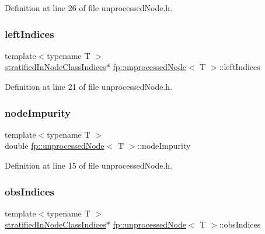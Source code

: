 Definition at line 26 of file unprocessed\+Node.\+h.

\mbox{\label{classfp_1_1unprocessedNode_a0a147fea04670ff34ef0891a14ec67a3}} 
\subsubsection{\texorpdfstring{left\+Indices}{leftIndices}}
{\footnotesize\ttfamily template$<$typename T $>$ \\
\hyperlink{classfp_1_1stratifiedInNodeClassIndices}{stratified\+In\+Node\+Class\+Indices}$\ast$ \hyperlink{classfp_1_1unprocessedNode}{fp\+::unprocessed\+Node}$<$ T $>$\+::left\+Indices\hspace{0.3cm}{\ttfamily [protected]}}



Definition at line 21 of file unprocessed\+Node.\+h.

\mbox{\label{classfp_1_1unprocessedNode_a5bb6906b09625f7893bf0ffd512b1714}} 
\subsubsection{\texorpdfstring{node\+Impurity}{nodeImpurity}}
{\footnotesize\ttfamily template$<$typename T $>$ \\
double \hyperlink{classfp_1_1unprocessedNode}{fp\+::unprocessed\+Node}$<$ T $>$\+::node\+Impurity\hspace{0.3cm}{\ttfamily [protected]}}



Definition at line 15 of file unprocessed\+Node.\+h.

\mbox{\label{classfp_1_1unprocessedNode_aea171244695a3a099061188a9553e525}} 
\subsubsection{\texorpdfstring{obs\+Indices}{obsIndices}}
{\footnotesize\ttfamily template$<$typename T $>$ \\
\hyperlink{classfp_1_1stratifiedInNodeClassIndices}{stratified\+In\+Node\+Class\+Indices}$\ast$ \hyperlink{classfp_1_1unprocessedNode}{fp\+::unprocessed\+Node}$<$ T $>$\+::obs\+Indices\hspace{0.3cm}{\ttfamily [protected]}}



